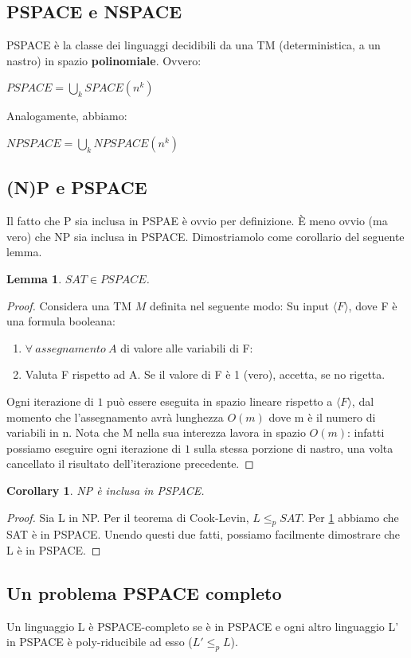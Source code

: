 \documentclass[a4paper, 12pt]{article}
\newtheorem{lemma}[theorem]{Lemma}
\newtheorem{corollary}{Corollary}[theorem]
\begin{document}
\subsection{PSPACE e NSPACE}
PSPACE \`e la classe dei linguaggi decidibili da una TM (deterministica, a un nastro) in spazio \textbf{polinomiale}. Ovvero:
\begin{center}
$PSPACE = \bigcup_k SPACE(n^{k})$
\end{center}
Analogamente, abbiamo:
\begin{center}
$NPSPACE = \bigcup_k NPSPACE(n^{k})$
\end{center}
\subsection{(N)P e PSPACE}
Il fatto che P sia inclusa in PSPAE \`e ovvio per definizione. \`E meno ovvio (ma vero) che NP sia inclusa in PSPACE. Dimostriamolo come corollario del seguente lemma.
\begin{lemma}
\label{lemma:2}
$SAT \in PSPACE$.
\end{lemma}
\begin{proof}
Considera una TM $M$ definita nel seguente modo:
Su input $\langle F \rangle$, dove F \`e una formula booleana:

\begin{enumerate}
\item $\forall\ assegnamento\ A$ di valore alle variabili di F:
\item Valuta F rispetto ad A. Se il valore di F \`e 1 (vero), accetta, se no rigetta.
\end{enumerate}
Ogni iterazione di $1$ pu\`o essere eseguita in spazio lineare rispetto a $\langle F \rangle$, dal momento che l'assegnamento avr\`a lunghezza $O(m)$ dove m \`e il numero di variabili in n. Nota che M nella sua interezza lavora in spazio $O(m)$: infatti possiamo eseguire ogni iterazione di $1$ sulla stessa porzione di nastro, una volta cancellato il risultato dell'iterazione precedente.
\end{proof}
\begin{corollary}
NP \`e inclusa in PSPACE.
\end{corollary}
\begin{proof}
Sia L in NP. Per il teorema di Cook-Levin, $L \leq_p SAT$. Per \ref{lemma:2} abbiamo che SAT \`e in PSPACE. Unendo questi due fatti, possiamo facilmente dimostrare che L \`e in PSPACE.
\end{proof}
\subsection{Un problema PSPACE completo}
Un linguaggio L \`e PSPACE-completo se \`e in PSPACE e ogni altro linguaggio L' in PSPACE \`e poly-riducibile ad esso ($L' \leq_p L$).
\end{document}
